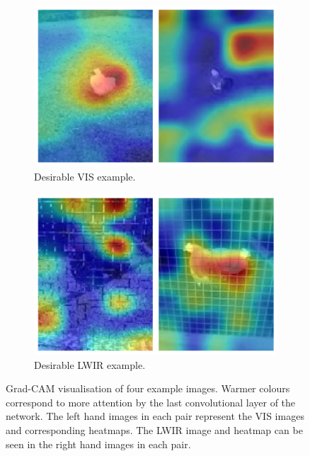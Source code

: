 \documentclass{l4proj}
\begin{document}
\begin{figure}[ht]
  \begin{subfigure}[h!]{0.45\textwidth}
    \includegraphics[width=\textwidth]{images/evaluation/grad_cam/vis}
    \caption{Desirable VIS example.}
    \label{fig:grad_cam_vis}
  \end{subfigure}
  \quad
  \begin{subfigure}[h!]{0.45\textwidth}
    \includegraphics[width=\textwidth]{images/evaluation/grad_cam/lwir}
    \caption{Desirable LWIR example.}
    \label{fig:grad_cam_lwir}
  \end{subfigure}
  \caption{Grad-CAM visualisation of four example images. Warmer colours correspond to more attention by the last convolutional layer of the network. The left hand images in each pair represent the VIS images and corresponding heatmaps. The LWIR image and heatmap can be seen in the right hand images in each pair.}
  \label{fig:grad_cam}
\end{figure}
\end{document}
